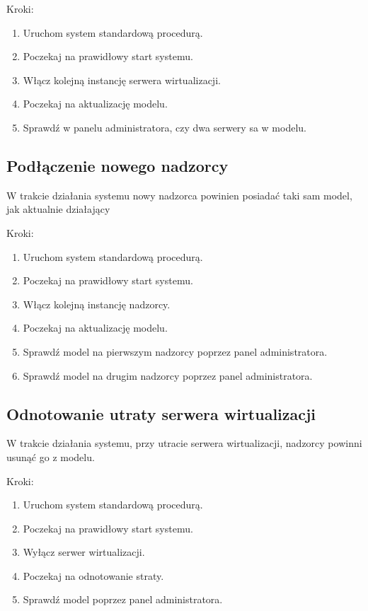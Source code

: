 \documentclass[../analiza-rozwiazania.tex]{subfiles}
\begin{document}
Kroki:
\begin{enumerate}
  \item Uruchom system standardową procedurą.
  \item Poczekaj na prawidłowy start systemu.
  \item Włącz kolejną instancję serwera wirtualizacji.
  \item Poczekaj na aktualizację modelu.
  \item Sprawdź w panelu administratora, czy dwa serwery sa w modelu.
\end{enumerate}

\subsection{Podłączenie nowego nadzorcy}
W trakcie działania systemu nowy nadzorca powinien posiadać taki sam model, jak aktualnie działający

Kroki:
\begin{enumerate}
  \item Uruchom system standardową procedurą.
  \item Poczekaj na prawidłowy start systemu.
  \item Włącz kolejną instancję nadzorcy.
  \item Poczekaj na aktualizację modelu.
  \item Sprawdź model na pierwszym nadzorcy poprzez panel administratora.
  \item Sprawdź model na drugim nadzorcy poprzez panel administratora.
\end{enumerate}

\subsection{Odnotowanie utraty serwera wirtualizacji}
W trakcie działania systemu, przy utracie serwera wirtualizacji, nadzorcy powinni usunąć go z modelu.

Kroki:
\begin{enumerate}
  \item Uruchom system standardową procedurą.
  \item Poczekaj na prawidłowy start systemu.
  \item Wyłącz serwer wirtualizacji.
  \item Poczekaj na odnotowanie straty.
  \item Sprawdź model poprzez panel administratora.
\end{enumerate}
\end{document}
